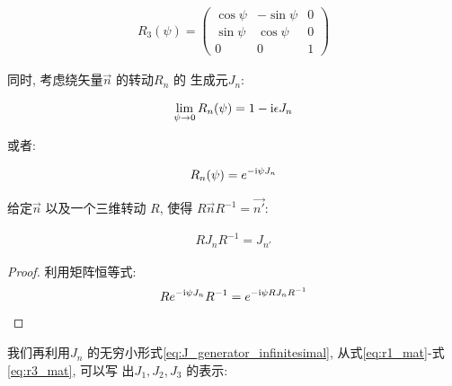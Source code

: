\begin{equation}\label{eq:r3_mat}
  \begin{aligned}
    R_{3}(\psi) =
    \begin{pmatrix}
      \cos \psi & -\sin \psi & 0 \\
      \sin \psi & \cos \psi & 0\\
      0 & 0 & 1
    \end{pmatrix}
  \end{aligned}
\end{equation}

同时, 考虑绕矢量$\vec{n}$ 的转动$R_{n}$ 的
生成元$J_{n}$:

\begin{equation}\label{eq:J_generator_infinitesimal}
  \begin{aligned}
    \lim_{\psi\to 0} R_{n}(\psi) = 1 - {\rm i} \epsilon J_{n}
  \end{aligned}
\end{equation}

或者:

\begin{equation}\label{eq:J_generator_exponential}
  \begin{aligned}
    R_{n}(\psi) = e^{- {\rm i} \psi J_{n}}
  \end{aligned}
\end{equation}

\begin{lemma}[ $J_{n}$ 的矢量性]
  给定$\vec{n}$ 以及一个三维转动 $R$, 使得
  $R \vec{n}R^{-1}=\vec{n'}$:

  \begin{equation}
    \begin{aligned}
      R J_{n} R^{-1} = J_{n'}
    \end{aligned}
  \end{equation}

\end{lemma}
\begin{proof}
  利用矩阵恒等式:
  \begin{equation}
    \begin{aligned}
      R e^{- {\rm i}\psi J_{n}}R^{-1} = e^{- {\rm i}\psi R J_{n} R^{-1}}
    \end{aligned}
  \end{equation}
\end{proof}

我们再利用$J_{n}$ 的无穷小形式\ref{eq:J_generator_infinitesimal},
从式\ref{eq:r1_mat}-式\ref{eq:r3_mat}, 可以写
出$J_1, J_{2}, J_3$ 的表示:

